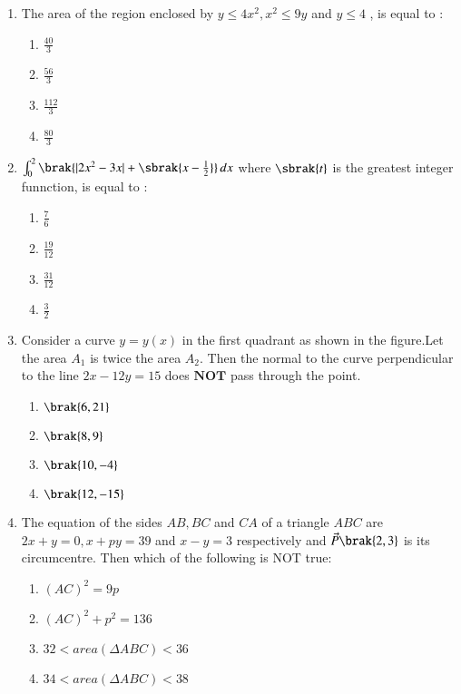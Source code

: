 \documentclass[journal]{IEEEtran}
\begin{document}
\begin{enumerate}
    \item The area of the region enclosed by $y \le 4x^2 , x^2 \le 9y$ and $y \le 4$ , is equal to :
    \begin{enumerate}
        \item $\frac{40}{3}$
        \item $\frac{56}{3}$
        \item $\frac{112}{3}$
        \item $\frac{80}{3}$     
    \end{enumerate}


    \item $\int_{0}^2 \brak{|2x^{2} - 3x|+ \sbrak{x -\frac{1}{2}}}\, dx$ where $\sbrak{t}$ is the greatest integer funnction, is equal to :
    \begin{enumerate}
        \item $\frac{7}{6}$ 
        \item $\frac{19}{12}$ 
        \item $\frac{31}{12}$ 
        \item $\frac{3}{2}$
    \end{enumerate}


    \item Consider a curve $y=y(x)$ in the first quadrant as shown in the figure.Let the area $A_1$ is twice the area $A_2$. Then the normal to the curve perpendicular to the line $2x-12y=15$ does $\textbf{NOT}$ pass through the point.
	    \\\begin{center}
		    \scalebox{0.75}{}
	    \end{center}
    \begin{enumerate}
        \item $\brak{6,21}$
        \item $\brak{8,9}$
        \item $\brak{10,-4}$
        \item $\brak{12,-15}$
    \end{enumerate}


    \item The equation of the sides $AB, BC$ and $CA$ of a triangle $ABC$ are $2x+y=0 , x+py=39 $ and $x-y=3$ respectively and $\vec{P}\brak{2,3}$ is its circumcentre. Then which of the following is NOT true:
    \begin{enumerate}
        \item $(AC)^2 =9p$
        \item $(AC)^2 + p^2 = 136$
        \item $32 < area(\Delta ABC) <36$
        \item $34 < area(\Delta ABC) <38$
    \end{enumerate}
    

\end{enumerate}
\end{document}
